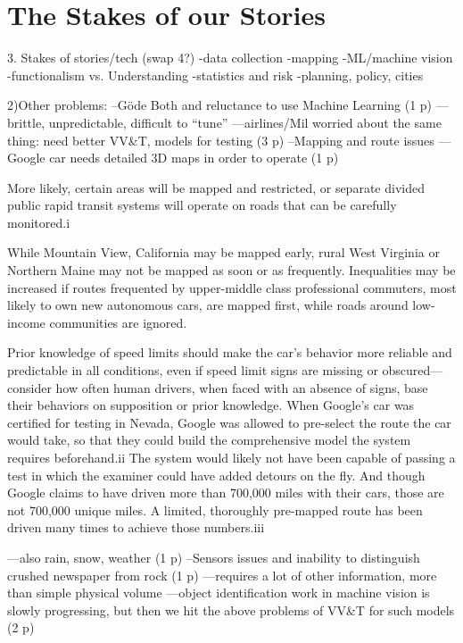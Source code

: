 \chapter{The Stakes of our Stories}

3. Stakes of stories/tech (swap 4?)
-data collection
-mapping
-ML/machine vision
-functionalism vs. Understanding
-statistics and risk
-planning, policy, cities





2)Other problems:
--Göde Both and reluctance to use Machine Learning (1 p)
---brittle, unpredictable, difficult to ``tune''
---airlines/Mil worried about the same thing: need better VV\&T, models
for testing (3 p)
--Mapping and route issues
---Google car needs detailed 3D maps in order to operate (1 p)

 More likely, certain areas will be
mapped and restricted, or separate divided public rapid transit
systems will operate on roads that can be carefully monitored.i

While
Mountain View, California may be mapped early, rural West Virginia or
Northern Maine may not be mapped as soon or as frequently.
Inequalities may be increased if routes frequented by upper-middle
class professional commuters, most likely to own new autonomous cars,
are mapped first, while roads around low-income communities are
ignored. 

Prior knowledge of speed limits should make the car's
behavior more reliable and predictable in all conditions, even if
speed limit signs are missing or obscured—consider how often human
drivers, when faced with an absence of signs, base their behaviors on
supposition or prior knowledge. When Google's car was certified for
testing in Nevada, Google was allowed to pre-select the route the car
would take, so that they could build the comprehensive model the
system requires beforehand.ii The system would likely not have been
capable of passing a test in which the examiner could have added
detours on the fly. And though Google claims to have driven more than
700,000 miles with their cars, those are not 700,000 unique miles. A
limited, thoroughly pre-mapped route has been driven many times to
achieve those numbers.iii


---also rain, snow, weather (1 p)
--Sensors issues and inability to distinguish crushed newspaper from
rock (1 p)
---requires a lot of other information, more than simple physical
volume
---object identification work in machine vision is slowly progressing,
but then we hit the above problems of VV\&T for such models (2 p)

